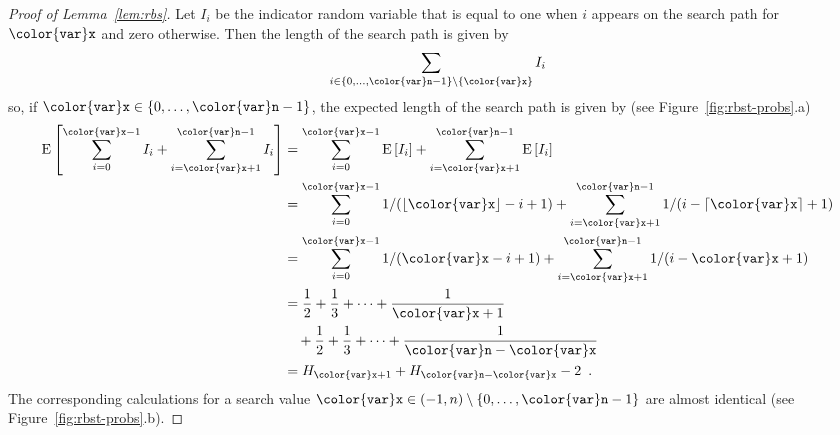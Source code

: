\documentclass[10pt]{book}
\newcommand{\figref}[1]{Figure~\ref{fig:#1}}
\theoremstyle{plain}
\newcommand{\lemref}[1]{Lemma~\ref{lem:#1}}
\theoremstyle{definition}
\newcommand{\E}{\mathrm{E}}
\begin{document}
\begin{proof}[Proof of \lemref{rbs}]
Let $I_i$ be the indicator random variable that is equal to one when $i$
appears on the search path for \ensuremath{\mathtt{{\color{var}x}}} and zero otherwise.  Then the length
of the search path is given by
\[
  \sum_{i\in\{0,\ldots,\ensuremath{\mathtt{{\color{var}n}}}-1\}\setminus\{\ensuremath{\mathtt{{\color{var}x}}}\}} I_i
\]
so, if $\ensuremath{\mathtt{{\color{var}x}}}\in\{0,\ldots,\ensuremath{\mathtt{{\color{var}n}}}-1\}$, the expected length of the search
path is given by (see \figref{rbst-probs}.a)
\begin{align*}
  \E\left[\sum_{i=0}^{\ensuremath{\mathtt{{\color{var}x}}}-1} I_i + \sum_{i=\ensuremath{\mathtt{{\color{var}x}}}+1}^{\ensuremath{\mathtt{{\color{var}n}}}-1} I_i\right]
   & =  \sum_{i=0}^{\ensuremath{\mathtt{{\color{var}x}}}-1} \E\left[I_i\right]
         + \sum_{i=\ensuremath{\mathtt{{\color{var}x}}}+1}^{\ensuremath{\mathtt{{\color{var}n}}}-1} \E\left[I_i\right] \\
   & = \sum_{i=0}^{\ensuremath{\mathtt{{\color{var}x}}}-1} 1/(\lfloor\ensuremath{\mathtt{{\color{var}x}}}\rfloor-i+1)
         + \sum_{i=\ensuremath{\mathtt{{\color{var}x}}}+1}^{\ensuremath{\mathtt{{\color{var}n}}}-1} 1/(i-\lceil\ensuremath{\mathtt{{\color{var}x}}}\rceil+1) \\
   & = \sum_{i=0}^{\ensuremath{\mathtt{{\color{var}x}}}-1} 1/(\ensuremath{\mathtt{{\color{var}x}}}-i+1)
         + \sum_{i=\ensuremath{\mathtt{{\color{var}x}}}+1}^{\ensuremath{\mathtt{{\color{var}n}}}-1} 1/(i-\ensuremath{\mathtt{{\color{var}x}}}+1) \\
   & = \frac{1}{2}+\frac{1}{3}+\cdots+\frac{1}{\ensuremath{\mathtt{{\color{var}x}}}+1} \\
   & \quad {} + \frac{1}{2}+\frac{1}{3}+\cdots+\frac{1}{\ensuremath{\mathtt{{\color{var}n}}}-\ensuremath{\mathtt{{\color{var}x}}}} \\
   & = H_{\ensuremath{\mathtt{{\color{var}x}}}+1} + H_{\ensuremath{\mathtt{{\color{var}n}}}-\ensuremath{\mathtt{{\color{var}x}}}} - 2  \enspace .
\end{align*}
The corresponding calculations for a search value
$\ensuremath{\mathtt{{\color{var}x}}}\in(-1,n)\setminus\{0,\ldots,\ensuremath{\mathtt{{\color{var}n}}}-1\}$ are almost identical (see
\figref{rbst-probs}.b).
\end{proof}
\end{document}
